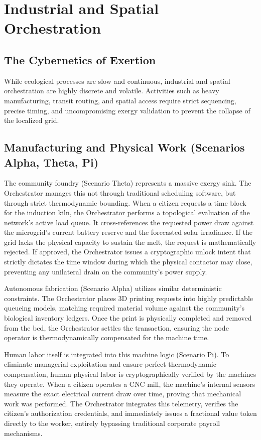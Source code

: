 \chapter{Industrial and Spatial Orchestration}

\section{The Cybernetics of Exertion}
While ecological processes are slow and continuous, industrial and spatial orchestration are highly discrete and volatile. Activities such as heavy manufacturing, transit routing, and spatial access require strict sequencing, precise timing, and uncompromising exergy validation to prevent the collapse of the localized grid.

\section{Manufacturing and Physical Work (Scenarios Alpha, Theta, Pi)}
The community foundry (Scenario Theta) represents a massive exergy sink. The Orchestrator manages this not through traditional scheduling software, but through strict thermodynamic bounding. When a citizen requests a time block for the induction kiln, the Orchestrator performs a topological evaluation of the network's active load queue. It cross-references the requested power draw against the microgrid's current battery reserve and the forecasted solar irradiance. If the grid lacks the physical capacity to sustain the melt, the request is mathematically rejected. If approved, the Orchestrator issues a cryptographic unlock intent that strictly dictates the time window during which the physical contactor may close, preventing any unilateral drain on the community's power supply.

Autonomous fabrication (Scenario Alpha) utilizes similar deterministic constraints. The Orchestrator places 3D printing requests into highly predictable queueing models, matching required material volume against the community's biological inventory ledgers. Once the print is physically completed and removed from the bed, the Orchestrator settles the transaction, ensuring the node operator is thermodynamically compensated for the machine time.

Human labor itself is integrated into this machine logic (Scenario Pi). To eliminate managerial exploitation and ensure perfect thermodynamic compensation, human physical labor is cryptographically verified by the machines they operate. When a citizen operates a CNC mill, the machine's internal sensors measure the exact electrical current draw over time, proving that mechanical work was performed. The Orchestrator integrates this telemetry, verifies the citizen's authorization credentials, and immediately issues a fractional value token directly to the worker, entirely bypassing traditional corporate payroll mechanisms.

